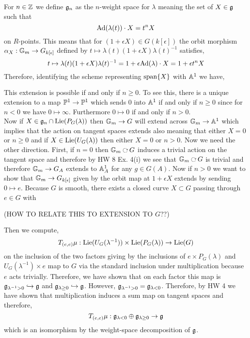 \documentclass[12pt]{article}
\begin{document}
For $n \in \Z$ we define $\g_n$ as the $n$-weight space for $\lambda$ meaning the set of $X \in \g$ such that
\[ \Ad(\lambda(t)) \cdot X = t^n X \]
on $R$-points. This means that for $(1 + \epsilon X) \in G(k[\epsilon])$ the orbit morphism $\alpha_X : \Gm \to G_{k[\epsilon]}$ defined by $t \mapsto \lambda(t) (1 + \epsilon X) \lambda(t)^{-1}$ satisfies,
\[ t \mapsto \lambda(t) (1 + \epsilon X) \lambda(t)^{-1} = 1 + \epsilon \Ad(\lambda) \cdot X = 1 + \epsilon t^n X \]
Therefore, identifying the scheme representing $\vspan{X}$ with $\A^1$ we have,
\begin{center}
\end{center}
This extension is possible if and only if $n \ge 0$. To see this, there is a unique extension to a map $\P^1 \to \P^1$ which sends $0$ into $\A^1$ if and only if $n \ge 0$ since for $n < 0$ we have $0 \mapsto \infty$. Furthermore $0 \mapsto 0$ if and only if $n > 0$. 
\bigskip\\
Now if $X \in \g_n \cap \Lie{(P_G(\lambda))}$ then $\Gm \to G$ will extend across $\Gm \to \A^1$ which implies that the action on tangent spaces extends also meaning that either $X = 0$ or $n \ge 0$ and if $X \in \Lie{(U_G(\lambda))}$ then either $X = 0$ or $n > 0$. Now we need the other direction. First, if $n = 0$ then $\Gm \acts G$ induces a trivial action on the tangent space and therefore by HW 8 Ex. 4(i) we see that $\Gm \acts G$ is trivial and therefore $\Gm \to G_A$ extends to $\A^1_A$ for any $g \in G(A)$. Now if $n > 0$ we want to show that $\Gm \to G_{k[\epsilon]}$ given by the orbit map at $1 + \epsilon X$ extends by sending $0 \mapsto e$. Because $G$ is smooth, there exists a closed curve $X \subset G$ passing through $e \in G$ with 



(HOW TO RELATE THIS TO EXTENSION TO $G$??)


Then we compute,
\[ T_{(e,e)} \mu : \Lie{(U_G(\lambda^{-1}))} \times \Lie{(P_G(\lambda))} \to \Lie{(G)} \]
on the inclusion of the two factors giving by the inclusions of $e \times P_G(\lambda)$ and $U_G(\lambda^{-1}) \times e$ map to $G$ via the standard inclusion under multiplication because $e$ acts trivially. Therefore, we have shown that on each factor this map is $\g_{\lambda^{-1} > 0} \embed \g$ and $\g_{\lambda \ge 0} \embed \g$. However, $\g_{\lambda^{-1} > 0} = \g_{\lambda < 0}$. Therefore, by HW 4 we have shown that multiplication induces a sum map on tangent spaces and therefore,
\[ T_{(e,e)} \mu : \g_{\lambda < 0} \oplus \g_{\lambda \ge 0} \to \g \]
which is an isomorphism by the weight-space decomposition of $\g$.
\end{document}
